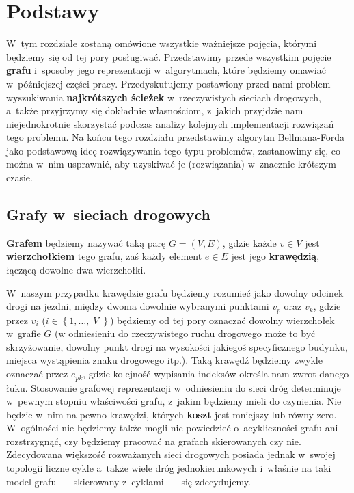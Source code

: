 \chapter{Podstawy}



W~tym rozdziale zostaną omówione wszystkie ważniejsze pojęcia, którymi będziemy się od tej pory posługiwać.
Przedstawimy przede wszystkim pojęcie \textbf{grafu} i~sposoby jego reprezentacji w~algorytmach, które będziemy omawiać w~późniejszej części pracy.
Przedyskutujemy postawiony przed nami problem wyszukiwania \textbf{najkrótszych ścieżek} w~rzeczywistych sieciach drogowych, a~także przyjrzymy się dokładnie własnościom, z~jakich przyjdzie nam niejednokrotnie skorzystać podczas analizy kolejnych implementacji rozwiązań tego problemu.
Na końcu tego rozdziału przedstawimy algorytm Bellmana-Forda jako podstawową ideę rozwiązywania tego typu problemów, zastanowimy się, co można w~nim usprawnić, aby uzyskiwać je (rozwiązania) w~znacznie krótszym czasie.


\section{Grafy w~sieciach drogowych}


\textbf{Grafem} będziemy nazywać taką parę $G = \left( V, E \right) $, gdzie każde $v \in V$ jest \textbf{wierzchołkiem} tego grafu, zaś każdy element $e \in E$ jest jego \textbf{krawędzią}, łączącą dowolne dwa wierzchołki.

W~naszym przypadku krawędzie grafu będziemy rozumieć jako dowolny odcinek drogi na jezdni, między dwoma dowolnie wybranymi punktami $v_{p}$ oraz $v_{k}$, gdzie przez $v_{i}$ ($i \in \left\{ 1, \ldots, \left| V \right| \right\}$) będziemy od tej pory oznaczać dowolny wierzchołek w~grafie $G$ (w odniesieniu do rzeczywistego ruchu drogowego może to być skrzyżowanie, dowolny punkt drogi na wysokości jakiegoś specyficznego budynku, miejsca wystąpienia znaku drogowego itp.).
Taką krawędź będziemy zwykle oznaczać przez $e_{pk}$, gdzie kolejność wypisania indeksów określa nam zwrot danego łuku.
Stosowanie grafowej reprezentacji w~odniesieniu do sieci dróg determinuje w~pewnym stopniu właściwości grafu, z~jakim będziemy mieli do czynienia.
Nie będzie w~nim na pewno krawędzi, których \textbf{koszt} jest mniejszy lub równy zero.
W~ogólności nie będziemy także mogli nic powiedzieć o~acykliczności grafu ani rozstrzygnąć, czy będziemy pracować na grafach skierowanych czy nie.
Zdecydowana większość rozważanych sieci drogowych posiada jednak w~swojej topologii liczne cykle a~także wiele dróg jednokierunkowych i~właśnie na taki model grafu~---  skierowany z~cyklami~---  się zdecydujemy.


